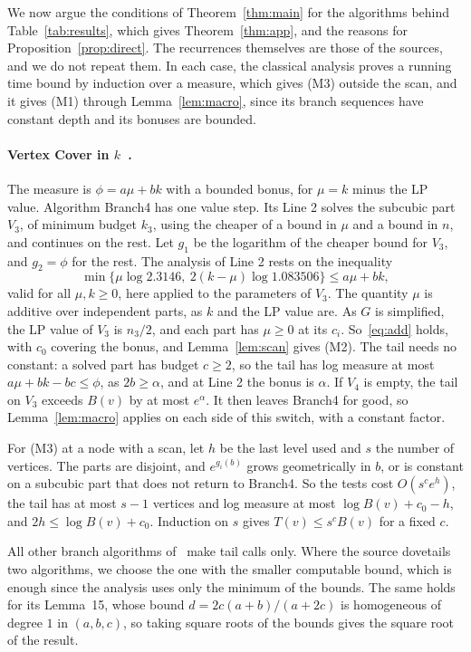 \documentclass[11pt]{article}
\theoremstyle{definition}
\theoremstyle{remark}
\begin{document}
We now argue the conditions of Theorem~\ref{thm:main} for the algorithms behind Table~\ref{tab:results}, which gives Theorem~\ref{thm:app}, and the reasons for Proposition~\ref{prop:direct}. The recurrences themselves are those of the sources, and we do not repeat them. In each case, the classical analysis proves a running time bound by induction over a measure, which gives (M3) outside the scan, and it gives (M1) through Lemma~\ref{lem:macro}, since its branch sequences have constant depth and its bonuses are bounded.

\paragraph{Vertex Cover in $k$~\cite{HN24}.} The measure is $\phi=a\mu+bk$ with a bounded bonus, for $\mu=k$ minus the LP value. Algorithm Branch4 has one value step. Its Line 2 solves the subcubic part $V_3$, of minimum budget $k_3$, using the cheaper of a bound in $\mu$ and a bound in $n$, and continues on the rest. Let $g_1$ be the logarithm of the cheaper bound for $V_3$, and $g_2=\phi$ for the rest. The analysis of Line 2 rests on the inequality
\[
\min\{\mu\log2.3146,\ 2(k-\mu)\log1.083506\}\le a\mu+bk,
\]
valid for all $\mu,k\ge0$, here applied to the parameters of $V_3$. The quantity $\mu$ is additive over independent parts, as $k$ and the LP value are. As $G$ is simplified, the LP value of $V_3$ is $n_3/2$, and each part has $\mu\ge0$ at its $c_i$. So~\eqref{eq:add} holds, with $c_0$ covering the bonus, and Lemma~\ref{lem:scan} gives (M2). The tail needs no constant: a solved part has budget $c\ge2$, so the tail has log measure at most $a\mu+bk-bc\le\phi$, as $2b\ge\alpha$, and at Line 2 the bonus is $\alpha$. If $V_4$ is empty, the tail on $V_3$ exceeds $B(v)$ by at most $e^\alpha$. It then leaves Branch4 for good, so Lemma~\ref{lem:macro} applies on each side of this switch, with a constant factor.

For (M3) at a node with a scan, let $h$ be the last level used and $s$ the number of vertices. The parts are disjoint, and $e^{g_i(b)}$ grows geometrically in $b$, or is constant on a subcubic part that does not return to Branch4. So the tests cost $O(s^ce^h)$, the tail has at most $s-1$ vertices and log measure at most $\log B(v)+c_0-h$, and $2h\le\log B(v)+c_0$. Induction on $s$ gives $T(v)\le s^cB(v)$ for a fixed $c$.

All other branch algorithms of~\cite{HN24} make tail calls only. Where the source dovetails two algorithms, we choose the one with the smaller computable bound, which is enough since the analysis uses only the minimum of the bounds. The same holds for its Lemma~15, whose bound $d=2c(a+b)/(a+2c)$ is homogeneous of degree $1$ in $(a,b,c)$, so taking square roots of the bounds gives the square root of the result.
\end{document}
